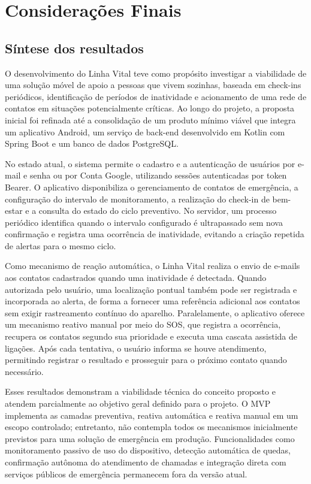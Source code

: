 
\chapter{Considerações Finais}

\section{Síntese dos resultados}

O desenvolvimento do Linha Vital teve como propósito investigar a viabilidade de uma solução móvel de apoio a pessoas que vivem sozinhas, baseada em check-ins periódicos, identificação de períodos de inatividade e acionamento de uma rede de contatos em situações potencialmente críticas. Ao longo do projeto, a proposta inicial foi refinada até a consolidação de um produto mínimo viável que integra um aplicativo Android, um serviço de back-end desenvolvido em Kotlin com Spring Boot e um banco de dados PostgreSQL.

No estado atual, o sistema permite o cadastro e a autenticação de usuários por e-mail e senha ou por Conta Google, utilizando sessões autenticadas por token Bearer. O aplicativo disponibiliza o gerenciamento de contatos de emergência, a configuração do intervalo de monitoramento, a realização do check-in de bem-estar e a consulta do estado do ciclo preventivo. No servidor, um processo periódico identifica quando o intervalo configurado é ultrapassado sem nova confirmação e registra uma ocorrência de inatividade, evitando a criação repetida de alertas para o mesmo ciclo.

Como mecanismo de reação automática, o Linha Vital realiza o envio de e-mails aos contatos cadastrados quando uma inatividade é detectada. Quando autorizada pelo usuário, uma localização pontual também pode ser registrada e incorporada ao alerta, de forma a fornecer uma referência adicional aos contatos sem exigir rastreamento contínuo do aparelho. Paralelamente, o aplicativo oferece um mecanismo reativo manual por meio do SOS, que registra a ocorrência, recupera os contatos segundo sua prioridade e executa uma cascata assistida de ligações. Após cada tentativa, o usuário informa se houve atendimento, permitindo registrar o resultado e prosseguir para o próximo contato quando necessário.

Esses resultados demonstram a viabilidade técnica do conceito proposto e atendem parcialmente ao objetivo geral definido para o projeto. O MVP implementa as camadas preventiva, reativa automática e reativa manual em um escopo controlado; entretanto, não contempla todos os mecanismos inicialmente previstos para uma solução de emergência em produção. Funcionalidades como monitoramento passivo de uso do dispositivo, detecção automática de quedas, confirmação autônoma do atendimento de chamadas e integração direta com serviços públicos de emergência permanecem fora da versão atual.

